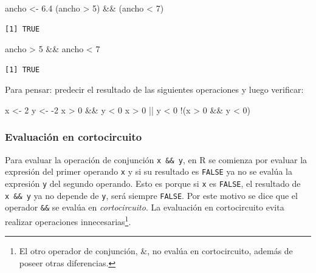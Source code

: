 \documentclass[
]{book}
\newenvironment{Shaded}{\begin{snugshade}}{\end{snugshade}}
\newcommand{\DecValTok}[1]{\textcolor[rgb]{0.00,0.00,0.81}{#1}}
\newcommand{\FloatTok}[1]{\textcolor[rgb]{0.00,0.00,0.81}{#1}}
\newcommand{\NormalTok}[1]{#1}
\newcommand{\OtherTok}[1]{\textcolor[rgb]{0.56,0.35,0.01}{#1}}
\newcommand{\SpecialCharTok}[1]{\textcolor[rgb]{0.00,0.00,0.00}{#1}}
\begin{document}
\begin{Shaded}
\begin{Highlighting}[]
\NormalTok{ancho }\OtherTok{\textless{}{-}} \FloatTok{6.4}
\NormalTok{(ancho }\SpecialCharTok{\textgreater{}} \DecValTok{5}\NormalTok{) }\SpecialCharTok{\&\&}\NormalTok{ (ancho }\SpecialCharTok{\textless{}} \DecValTok{7}\NormalTok{)}
\end{Highlighting}
\end{Shaded}

\begin{verbatim}
[1] TRUE
\end{verbatim}

\begin{Shaded}
\begin{Highlighting}[]
\NormalTok{ancho }\SpecialCharTok{\textgreater{}} \DecValTok{5} \SpecialCharTok{\&\&}\NormalTok{ ancho }\SpecialCharTok{\textless{}} \DecValTok{7}
\end{Highlighting}
\end{Shaded}

\begin{verbatim}
[1] TRUE
\end{verbatim}

Para pensar: predecir el resultado de las siguientes operaciones y luego verificar:

\begin{Shaded}
\begin{Highlighting}[]
\NormalTok{x }\OtherTok{\textless{}{-}} \DecValTok{2}
\NormalTok{y }\OtherTok{\textless{}{-}} \SpecialCharTok{{-}}\DecValTok{2}
\NormalTok{x }\SpecialCharTok{\textgreater{}} \DecValTok{0} \SpecialCharTok{\&\&}\NormalTok{ y }\SpecialCharTok{\textless{}} \DecValTok{0}
\NormalTok{x }\SpecialCharTok{\textgreater{}} \DecValTok{0} \SpecialCharTok{||}\NormalTok{ y }\SpecialCharTok{\textless{}} \DecValTok{0}
\SpecialCharTok{!}\NormalTok{(x }\SpecialCharTok{\textgreater{}} \DecValTok{0} \SpecialCharTok{\&\&}\NormalTok{ y }\SpecialCharTok{\textless{}} \DecValTok{0}\NormalTok{)}
\end{Highlighting}
\end{Shaded}

\hypertarget{evaluaciuxf3n-en-cortocircuito}{%
\subsubsection{Evaluación en cortocircuito}\label{evaluaciuxf3n-en-cortocircuito}}

Para evaluar la operación de conjunción \texttt{x\ \&\&\ y}, en R se comienza por evaluar la expresión del primer operando \texttt{x} y si su resultado es \texttt{FALSE} ya no se evalúa la expresión \texttt{y} del segundo operando. Esto es porque si \texttt{x} es \texttt{FALSE}, el resultado de \texttt{x\ \&\&\ y} ya no depende de \texttt{y}, será siempre \texttt{FALSE}. Por este motivo se dice que el operador \texttt{\&\&} se evalúa en \emph{cortocircuito}. La evaluación en cortocircuito evita realizar operaciones innecesarias\footnote{El otro operador de conjunción, \&, no evalúa en cortocircuito, además de poseer otras diferencias.}.
\end{document}
